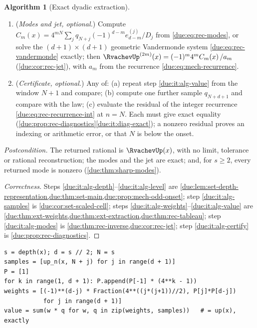 \documentclass[11pt,oneside]{article}
\theoremstyle{plain}
\theoremstyle{definition}
\newtheorem{algorithm}[theorem]{Algorithm}
\theoremstyle{remark}
\newcommand{\upn}[1]{\RvachevUp_{#1}}
\newcommand{\am}[1]{a_{#1}}                                 %
\newcommand{\Cr}[2]{C_{#1}\!\left(#2\right)}                %
\newcommand{\qn}[1]{q_{#1}}                                 %
\begin{document}
\begin{algorithm}[Exact dyadic extraction]
\begin{enumerate}[label=\textup{\arabic*.}]
 tableau of \cref{due:thm:rec-tableau}, whose last entry is the same
 rational.
\item\label{due:it:alg-modes}
 (\emph{Modes and jet, optional.})  Compute
 $\Cr{m}{x}=4^{mN}\sum_{j}\qn{N+j}(-1)^{d-m}e^{(j)}_{d-m}/D_{j}$
 from \cref{due:eq:rec-modes}, or solve the $(d+1)\times(d+1)$ geometric
 Vandermonde system \cref{due:eq:rec-vandermonde} exactly; then
 $\RvachevUp^{(2m)}(x)=(-1)^{m}4^{m}\Cr{m}{x}/\am{m}$ (\cref{due:cor:rec-jet}),
 with $\am{m}$ from the recurrence \cref{due:eq:mech-recurrence}.
\item\label{due:it:alg-certify}
 (\emph{Certificate, optional.})  Any of: (a) repeat step
 \ref{due:it:alg-value} from the window $N+1$ and compare; (b) compute one
 further sample $\qn{N+d+1}$ and compare with the law; (c) evaluate the
 residual of the integer recurrence \cref{due:eq:rec-recurrence-int} at
 $n=N$.  Each must give exact equality
 (\cref{due:prop:rec-diagnostics}\ref{due:it:diag-exact}); a nonzero
 residual proves an indexing or arithmetic error, or that $N$ is below the
 onset.
\end{enumerate}

\emph{Postcondition.}  The returned rational is $\RvachevUp(x)$, with no
limit, tolerance or rational reconstruction; the modes and the jet are
exact; and, for $s\ge2$, every returned mode is nonzero
(\cref{due:thm:sharp-modes}).
\end{algorithm}

\begin{proof}[Correctness]
Steps \ref{due:it:alg-depth}--\ref{due:it:alg-level} are
\cref{due:lem:set-depth-representation,due:thm:set-main,due:prop:mech-odd-onset};
step \ref{due:it:alg-samples} is \cref{due:cor:set-scaled-cell}; steps
\ref{due:it:alg-weights}--\ref{due:it:alg-value} are
\cref{due:thm:ext-weights,due:thm:ext-extraction,due:thm:rec-tableau};
step \ref{due:it:alg-modes} is \cref{due:thm:rec-inverse,due:cor:rec-jet};
step \ref{due:it:alg-certify} is \cref{due:prop:rec-diagnostics}.
\end{proof}

\begin{lstlisting}[style=pseudo,caption={The core of \cref{due:alg:exr-extraction} in exact rational arithmetic; \texttt{up\_n(x, n)} is the sample $\upn{n}(x)$ of step 3 and \texttt{P} the products $P_{i}$.},label={due:lst:exr-core}]
s = depth(x); d = s // 2; N = s
samples = [up_n(x, N + j) for j in range(d + 1)]
P = [1]
for k in range(1, d + 1): P.append(P[-1] * (4**k - 1))
weights = [(-1)**(d-j) * Fraction(4**((j*(j+1))//2), P[j]*P[d-j])
           for j in range(d + 1)]
value = sum(w * q for w, q in zip(weights, samples))   # = up(x), exactly
\end{lstlisting}
\end{document}
